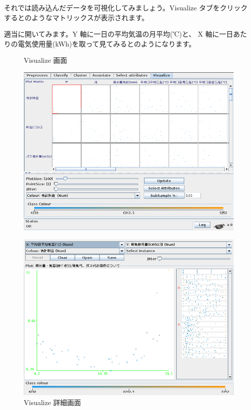 \documentclass[mingoth,a4paper]{jsarticle}
\begin{document}
それでは読み込んだデータを可視化してみましょう。Visualize タブをクリック
するとのようなマトリックスが表示されます。

適当に開いてみます。Y 軸に一日の平均気温の月平均(℃)と、 X 軸に一日あた
りの電気使用量(kWh)を取って見てみるとのようになります。

\begin{figure}[H]
 \begin{minipage}{0.5\hsize}
\begin{center}
\caption{Visualize 画面}
\label{fig:wekavisualize}
\includegraphics[width=1\hsize]{image201003/weka4.png}
\end{center}
\end{minipage}
\begin{minipage}{0.5\hsize}
 \begin{center}
 \caption{Visualize 詳細画面}
\label{fig:wekavisualizedetail}
 \includegraphics[width=1\hsize]{image201003/weka5.png}
 \end{center}
\end{minipage}
\end{figure}
\end{document}
